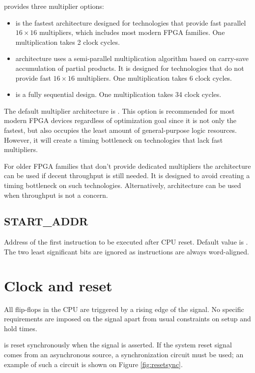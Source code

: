 \documentclass[a4paper,12pt,twoside,extrafontsizes]{memoir}
\begin{document}
\lxp{} provides three multiplier options:

\begin{itemize}
	\item {} is the fastest architecture designed for technologies that provide fast parallel $16 \times 16$ multipliers, which includes most modern FPGA families. One multiplication takes 2 clock cycles.
	\item {} architecture uses a semi-parallel multiplication algorithm based on carry-save accumulation of partial products. It is designed for technologies that do not provide fast $16 \times 16$ multipliers. One multiplication takes 6 clock cycles.
	\item {} is a fully sequential design. One multiplication takes 34 clock cycles.
\end{itemize}

The default multiplier architecture is . This option is recommended for most modern FPGA devices regardless of optimization goal since it is not only the fastest, but also occupies the least amount of general-purpose logic resources. However, it will create a timing bottleneck on technologies that lack fast multipliers.

For older FPGA families that don't provide dedicated multipliers the  architecture can be used if decent throughput is still needed. It is designed to avoid creating a timing bottleneck on such technologies. Alternatively,  architecture can be used when throughput is not a concern.

\subsection{START\_ADDR}

Address of the first instruction to be executed after CPU reset. Default value is . The two least significant bits are ignored as instructions are always word-aligned.

\section{Clock and reset}
\label{sec:clockreset}

All flip-flops in the CPU are triggered by a rising edge of the  signal. No specific requirements are imposed on the  signal apart from usual constraints on setup and hold times.

\lxp{} is reset synchronously when the  signal is asserted. If the system reset signal comes from an asynchronous source, a synchronization circuit must be used; an example of such a circuit is shown on Figure \ref{fig:resetsync}.
\end{document}
